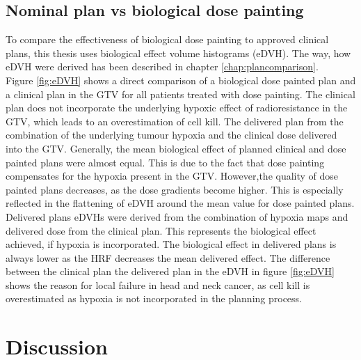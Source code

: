 \subsection{Nominal plan vs biological dose painting}
To compare the effectiveness of biological dose painting to approved clinical plans, this thesis uses biological effect volume histograms (eDVH). The way, how eDVH were derived has been described in chapter \ref{chap:plancomparison}.\\Figure \ref{fig:eDVH} shows a direct comparison of a biological dose painted plan and a clinical plan in the GTV for all patients treated with dose painting. The clinical plan does not incorporate the underlying hypoxic effect of radioresistance in the GTV, which leads to an overestimation of cell kill. The delivered plan from the combination of the underlying tumour hypoxia and the clinical dose delivered into the GTV. Generally, the mean biological effect of planned clinical and dose painted plans were almost equal. This is due to the fact that dose painting compensates for the hypoxia present in the GTV. However,the quality of dose painted plans decreases, as the dose gradients become higher. This is especially reflected in the flattening of eDVH around the mean value for dose painted plans. Delivered plans eDVHs were derived from the combination of hypoxia maps and delivered dose from the clinical plan. This represents the biological effect achieved, if hypoxia is incorporated. The biological effect in delivered plans is always lower as the HRF decreases the mean delivered effect. The difference between the clinical plan the delivered plan in the eDVH in figure \ref{fig:eDVH} shows the reason for local failure in head and neck cancer, as cell kill is overestimated as hypoxia is not incorporated in the planning process.
\begin{sidewaysfigure}[p]
\centering
{}
\caption{eDVH of GTV for all treated patients with biological dose painting. The biological effect of the delivered plan (blue) reduced through hypoxia is based on the clinical plan (green). Dose painting (red) is able to compensate for hypoxia by increasing the dose to such volumes. The dip in the eDVH for the delivered plan (blue) stems from the 2.5 mmHg hypoxia level.}
\label{fig:eDVH}
\end{sidewaysfigure}
\section{Discussion}
